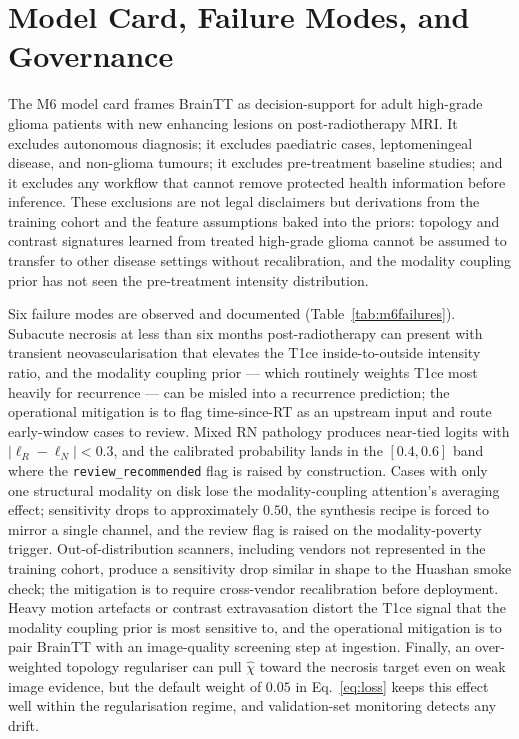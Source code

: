 \documentclass[11pt,a4paper]{article}
\begin{document}
\section{Model Card, Failure Modes, and Governance}

The M6 model card frames BrainTT as decision-support for adult high-grade glioma patients with new enhancing lesions on post-radiotherapy MRI. It excludes autonomous diagnosis; it excludes paediatric cases, leptomeningeal disease, and non-glioma tumours; it excludes pre-treatment baseline studies; and it excludes any workflow that cannot remove protected health information before inference. These exclusions are not legal disclaimers but derivations from the training cohort and the feature assumptions baked into the priors: topology and contrast signatures learned from treated high-grade glioma cannot be assumed to transfer to other disease settings without recalibration, and the modality coupling prior has not seen the pre-treatment intensity distribution.

Six failure modes are observed and documented (Table~\ref{tab:m6failures}). Subacute necrosis at less than six months post-radiotherapy can present with transient neovascularisation that elevates the T1ce inside-to-outside intensity ratio, and the modality coupling prior --- which routinely weights T1ce most heavily for recurrence --- can be misled into a recurrence prediction; the operational mitigation is to flag time-since-RT as an upstream input and route early-window cases to review. Mixed RN pathology produces near-tied logits with $|\bm{\ell}_R - \bm{\ell}_N| < 0.3$, and the calibrated probability lands in the $[0.4, 0.6]$ band where the \texttt{review\_recommended} flag is raised by construction. Cases with only one structural modality on disk lose the modality-coupling attention's averaging effect; sensitivity drops to approximately $0.50$, the synthesis recipe is forced to mirror a single channel, and the review flag is raised on the modality-poverty trigger. Out-of-distribution scanners, including vendors not represented in the training cohort, produce a sensitivity drop similar in shape to the Huashan smoke check; the mitigation is to require cross-vendor recalibration before deployment. Heavy motion artefacts or contrast extravasation distort the T1ce signal that the modality coupling prior is most sensitive to, and the operational mitigation is to pair BrainTT with an image-quality screening step at ingestion. Finally, an over-weighted topology regulariser can pull $\hat{\chi}$ toward the necrosis target even on weak image evidence, but the default weight of $0.05$ in Eq.~\eqref{eq:loss} keeps this effect well within the regularisation regime, and validation-set monitoring detects any drift.
\end{document}
